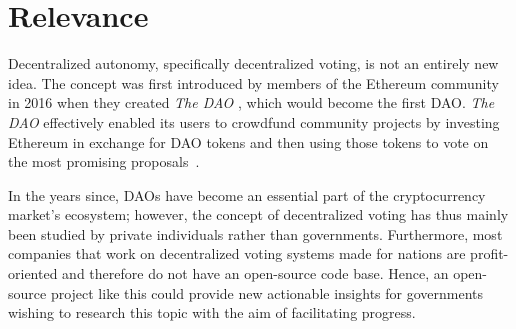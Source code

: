 \section{Relevance}\label{sec:relevance}

Decentralized autonomy, specifically decentralized voting, is not an entirely new idea.
The concept was first introduced by members of the Ethereum community in 2016 when they created \emph{The DAO} \autocites[section 3.1]{el_faqir_overview_2020}{falkon_story_2018}, which would become the first \gls{DAO}.
\emph{The DAO} effectively enabled its users to crowdfund community projects by investing Ethereum in exchange for DAO tokens and then using those tokens to vote on the most promising proposals~\autocite{falkon_story_2018}.

In the years since, \glspl{DAO} have become an essential part of the cryptocurrency market’s ecosystem;
however, the concept of decentralized voting has thus mainly been studied by private individuals rather than governments.
Furthermore, most companies that work on decentralized voting systems made for nations are profit-oriented and therefore do not have an open-source code base.
Hence, an open-source project like this could provide new actionable insights for governments wishing to research this topic with the aim of facilitating progress.



